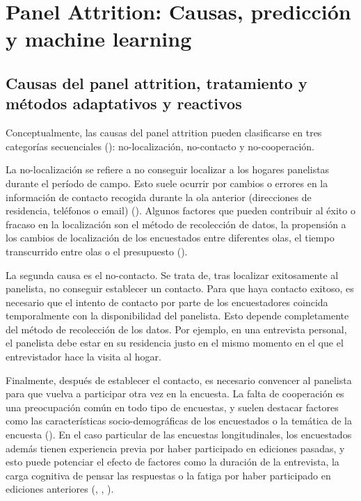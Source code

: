 \chapter{Panel Attrition: Causas, predicción y machine learning}
\label{chapter:attrition}
\section{Causas del panel attrition, tratamiento y métodos adaptativos y reactivos}

Conceptualmente, las causas del panel attrition pueden clasificarse en tres categorías secuenciales (\cite{lepkowski2002nonresponse}): no-localización, no-contacto y no-cooperación.

La no-localización se refiere a no conseguir localizar a los hogares panelistas durante el período de campo. Esto suele ocurrir por cambios o errores en la información de contacto recogida durante la ola anterior (direcciones de residencia, teléfonos o email) (\cite{couper2009keeping}). Algunos factores que pueden contribuir al éxito o fracaso en la localización son el método de recolección de datos, la propensión a los cambios de localización de los encuestados entre diferentes olas, el tiempo transcurrido entre olas o el presupuesto (\cite{lynn2009methods}).

La segunda causa es el no-contacto. Se trata de, tras localizar exitosamente al panelista, no conseguir establecer un contacto. Para que haya contacto exitoso, es necesario que el intento de contacto por parte de los encuestadores coincida temporalmente con la disponibilidad del panelista. Esto depende completamente del método de recolección de los datos. Por ejemplo, en una entrevista personal, el panelista debe estar en su residencia justo en el mismo momento en el que el entrevistador hace la visita al hogar.

Finalmente, después de establecer el contacto, es necesario convencer al panelista para que vuelva a participar otra vez en la encuesta. La falta de cooperación es una preocupación común en todo tipo de encuestas, y suelen destacar factores como las características socio-demográficas de los encuestados o la temática de la encuesta (\cite{groves1992understanding}). En el caso particular de las encuestas longitudinales, los encuestados además tienen experiencia previa por haber participado en ediciones pasadas, y esto puede potenciar el efecto de factores como la duración de la entrevista, la carga cognitiva de pensar las respuestas o la fatiga por haber participado en ediciones anteriores (\cite{laurie1999strategies}, \cite{watson2009identifying}, \cite{lynn2018tackling}).


